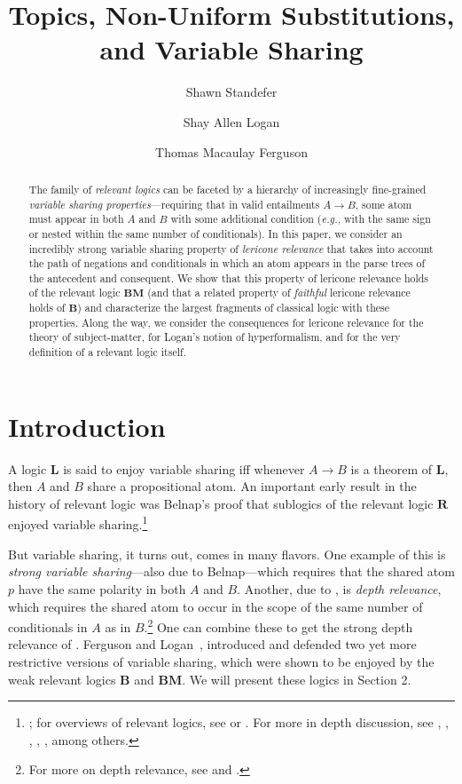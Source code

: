 \documentclass{amsart}
\title{Topics, Non-Uniform Substitutions, and Variable Sharing}
\author{Shawn Standefer}
\author{Shay Allen Logan}
\author{Thomas Macaulay Ferguson}
\theoremstyle{definition}
\newcommand{\logic}[1]{{\ensuremath {\mathbf{#1}}}}
\begin{document}
    \maketitle

\begin{abstract}
    The family of \emph{relevant logics} can be faceted by a hierarchy of increasingly fine-grained \emph{variable sharing properties}---requiring that in valid entailments $A\to B$, some atom must appear in both $A$ and $B$ with some additional condition (\emph{e.g.}, with the same sign or nested within the same number of conditionals). In this paper, we consider an incredibly strong variable sharing property of \emph{lericone relevance} that takes into account the path of negations and conditionals in which an atom appears in the parse trees of the antecedent and consequent. We show that this property of lericone relevance holds of the relevant logic $\mathbf{BM}$ (and that a related property of \emph{faithful} lericone relevance holds of $\mathbf{B}$) and characterize the largest fragments of classical logic with these properties. Along the way, we consider the consequences for lericone relevance for the theory of subject-matter, for Logan's notion of hyperformalism, and for the very definition of a relevant logic itself.
\end{abstract}

\section{Introduction}

A logic \logic{L} is said to enjoy variable sharing iff whenever $A\to B$ is a theorem of \logic{L}, then $A$ and $B$ share a propositional atom. An important early result in the history of relevant logic was Belnap's proof that sublogics of the relevant logic \logic{R} enjoyed variable sharing.\footnote{\citet{belnap1960}; for overviews of relevant logics, see \citet{Dunn2002-DUNRL} or \citet{Bimbo:2006aa}. 
For more in depth discussion, see \citet{anderson1975}, \citet{routley1982}, \citet{Read1988}, \citet{mares2004}, \citet{Logan:2023aa}, \citet{standefer202x} among others.
}

But variable sharing, it turns out, comes in many flavors. One example of this is \emph{strong variable sharing}---also due to Belnap---which requires that the shared atom $p$ have the same polarity in both $A$ and $B$. Another, due to \citet{brady1984}, is \emph{depth relevance}, which requires the shared atom to occur in the scope of the same number of conditionals in $A$ as in $B$.\footnote{For more on depth relevance, see \citet{robles2012, robles2014} and 
\citet{logan2022}.} One can combine these to get the strong depth relevance of \citet{logan2021}. Ferguson and Logan~\citeyearpar{FergusonForthcoming-FERTTA-7}, introduced and defended two yet more restrictive versions of variable sharing, which were shown to be enjoyed by the weak relevant logics $\mathbf{B}$ and $\mathbf{BM}$. We will present these logics in Section 2. 
\end{document}
